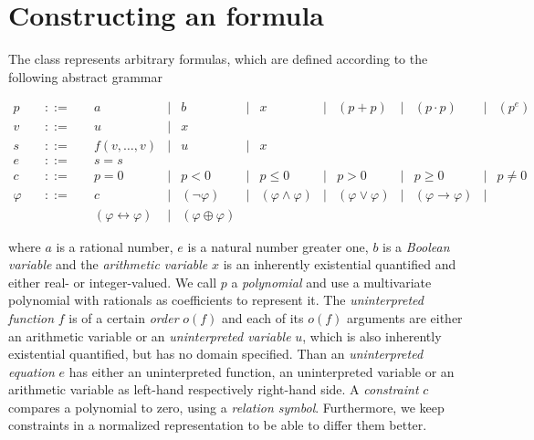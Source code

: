 \chapter{Constructing an \supportedLogics formula}
\label{chapter:constructingaformula}
The class \formulaClass represents arbitrary \supportedLogics formulas, which are
defined according to the following abstract grammar

\[
\begin{array}{rccccccccccccc}
  p &\quad ::=\quad & a & | & b & | & x & | & (p + p) & | & (p \cdot p) & | & (p^e) \\
  v &\quad ::=\quad & u & | & x \\
  s &\quad ::=\quad & f(v,\ldots,v) & | & u & | & x \\
  e &\quad ::=\quad & s = s \\
  c &\quad ::=\quad & p = 0 & | & p < 0 & | & p \leq 0 & | & p > 0 & | & p \geq 0 & | & p \neq 0 \\
 \varphi &\quad ::=\quad & c & | & (\neg \varphi) & | &
 (\varphi\land\varphi) & | &
 (\varphi\lor\varphi) & | & 
 (\varphi\rightarrow\varphi) & | \\ &&
 (\varphi\leftrightarrow\varphi) & | &
 (\varphi\oplus\varphi)
\end{array}
\]

where $a$ is a rational number, $e$ is a natural number greater one, $b$ is a \emph{Boolean variable} and the \emph{arithmetic variable} $x$ is an inherently existential quantified and either real- or integer-valued. We call $p$ a \emph{polynomial} and use a \carl multivariate polynomial with \cln rationals as coefficients to represent it. The \emph{uninterpreted function} $f$ is of a certain \emph{order} $o(f)$ and each of its $o(f)$ arguments are either an arithmetic variable or an \emph{uninterpreted variable} $u$, which is also inherently existential quantified, but has no domain specified. Than an \emph{uninterpreted equation} $e$ has either an uninterpreted function, an uninterpreted variable or an arithmetic variable as left-hand respectively right-hand side. A \emph{constraint} $c$ compares a polynomial to zero, using a \emph{relation symbol}. Furthermore, we keep constraints in a normalized representation to be able to differ them better.

